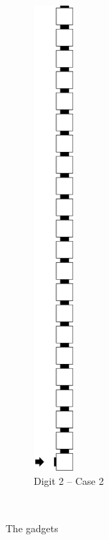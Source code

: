 \begin{itemize}
\begin{figure}[H]
\begin{subfigure}[t]{0.17\textwidth}
                \includegraphics[width=0.17\textwidth]{warping_post_warp_case2_digit2_msr}
                \caption{\label{fig:post_warp_case2_digit2_msr} Digit 2 -- Case 2}
            \end{subfigure}%
            ~
            \caption{\label{fig:post_warp_gadgets} The {\postwarp} gadgets }
        \end{figure}

    \end{itemize}
